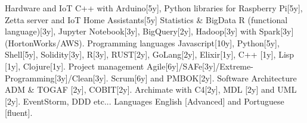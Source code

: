 \begin{cvskills}
\cvskill
{Hardware and IoT} %
{ C++ with Arduino[5y], Python libraries for Raspberry Pi[5y], Zetta server and IoT Home Assistants[5y]} %
\cvskill
{Statistics \& BigData} %
{ R (functional language)[3y], Jupyter Notebook[3y], BigQuery[2y], Hadoop[3y] with Spark[3y] (HortonWorks/AWS).} %
\cvskill
{Programming languages} %
{Javascript[10y], Python[5y], Shell[5y], Solidity[3y], R[3y], RUST[2y], GoLang[2y], Elixir[1y], C++ [1y], Lisp [1y], Clojure[1y].} %
\cvskill
{Project management} %
{Agile[6y]/SAFe[3y]/Extreme-Programming[3y]/Clean[3y]. Scrum[6y] and PMBOK[2y].} %
\cvskill
{Software Architecture} %
{ADM \& TOGAF [2y], COBIT[2y]. Archimate with C4[2y], MDL [2y] and UML [2y]. EventStorm, DDD etc...} %
\cvskill
{Languages} %
{English [Advanced] and Portuguese [fluent].} %
\end{cvskills}
